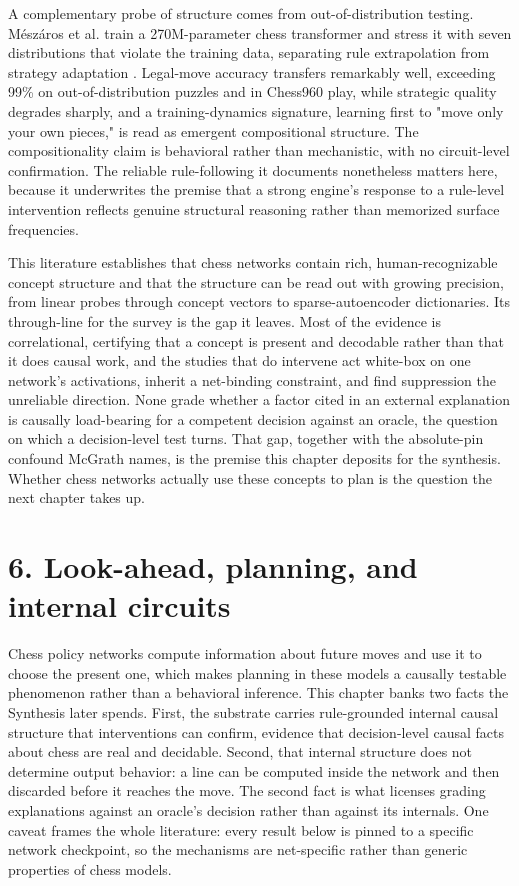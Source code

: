 \documentclass[conference]{IEEEtran}
\begin{document}
A complementary probe of structure comes from out-of-distribution testing. Mészáros et al. train a 270M-parameter chess transformer and stress it with seven distributions that violate the training data, separating rule extrapolation from strategy adaptation \cite{ref42}. Legal-move accuracy transfers remarkably well, exceeding 99\% on out-of-distribution puzzles and in Chess960 play, while strategic quality degrades sharply, and a training-dynamics signature, learning first to "move only your own pieces," is read as emergent compositional structure. The compositionality claim is behavioral rather than mechanistic, with no circuit-level confirmation. The reliable rule-following it documents nonetheless matters here, because it underwrites the premise that a strong engine's response to a rule-level intervention reflects genuine structural reasoning rather than memorized surface frequencies.

This literature establishes that chess networks contain rich, human-recognizable concept structure and that the structure can be read out with growing precision, from linear probes through concept vectors to sparse-autoencoder dictionaries. Its through-line for the survey is the gap it leaves. Most of the evidence is correlational, certifying that a concept is present and decodable rather than that it does causal work, and the studies that do intervene act white-box on one network's activations, inherit a net-binding constraint, and find suppression the unreliable direction. None grade whether a factor cited in an external explanation is causally load-bearing for a competent decision against an oracle, the question on which a decision-level test turns. That gap, together with the absolute-pin confound McGrath names, is the premise this chapter deposits for the synthesis. Whether chess networks actually use these concepts to plan is the question the next chapter takes up.

\section*{6. Look-ahead, planning, and internal circuits}
Chess policy networks compute information about future moves and use it to choose the present one, which makes planning in these models a causally testable phenomenon rather than a behavioral inference. This chapter banks two facts the Synthesis later spends. First, the substrate carries rule-grounded internal causal structure that interventions can confirm, evidence that decision-level causal facts about chess are real and decidable. Second, that internal structure does not determine output behavior: a line can be computed inside the network and then discarded before it reaches the move. The second fact is what licenses grading explanations against an oracle's decision rather than against its internals. One caveat frames the whole literature: every result below is pinned to a specific network checkpoint, so the mechanisms are net-specific rather than generic properties of chess models.
\end{document}
